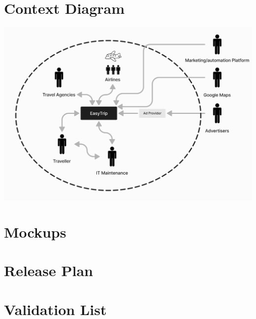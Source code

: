 \documentclass[a4paper]{article}
\begin{document}
\section{Context Diagram}
\includegraphics[width=.99\textwidth]{resources/contextDiagram.png}

\section{Mockups}

\section{Release Plan}


\section{Validation List}

\end{document}
